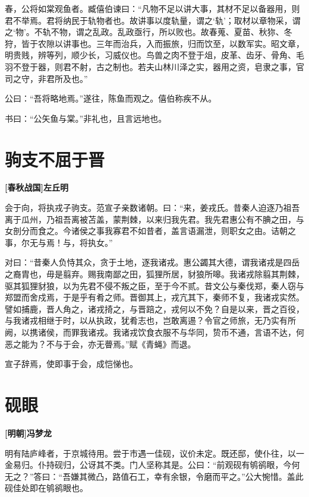 \documentclass[UTF8,titlepage,oneside]{ctexbook}
\begin{document}
春，公将如棠观鱼者。臧僖伯谏曰：“凡物不足以讲大事，其材不足以备器用，则君不举焉。君将纳民于轨物者也。故讲事以度轨量，谓之‘轨’；取材以章物采，谓之‘物’。不轨不物，谓之乱政。乱政亟行，所以败也。故春蒐、夏苗、秋狝、冬狩，皆于农隙以讲事也。三年而治兵，入而振旅，归而饮至，以数军实。昭文章，明贵贱，辨等列，顺少长，习威仪也。鸟兽之肉不登于俎，皮革、齿牙、骨角、毛羽不登于器，则君不射，古之制也。若夫山林川泽之实，器用之资，皂隶之事，官司之守，非君所及也。”


公曰：“吾将略地焉。”遂往，陈鱼而观之。僖伯称疾不从。


书曰：“公矢鱼与棠。”非礼也，且言远地也。



\chapter*{驹支不屈于晋}
\begin{center}
	\textbf{[春秋战国]左丘明}
\end{center}


会于向，将执戎子驹支。范宣子亲数诸朝。曰：“来，姜戎氏。昔秦人迫逐乃祖吾离于瓜州，乃祖吾离被苫盖，蒙荆棘，以来归我先君。我先君惠公有不腆之田，与女剖分而食之。今诸侯之事我寡君不如昔者，盖言语漏泄，则职女之由。诘朝之事，尔无与焉！与，将执女。”


对曰：“昔秦人负恃其众，贪于土地，逐我诸戎。惠公蠲其大德，谓我诸戎是四岳之裔胄也，毋是翦弃。赐我南鄙之田，狐狸所居，豺狼所嗥。我诸戎除翦其荆棘，驱其狐狸豺狼，以为先君不侵不叛之臣，至于今不贰。昔文公与秦伐郑，秦人窃与郑盟而舍戍焉，于是乎有肴之师。晋御其上，戎亢其下，秦师不复，我诸戎实然。譬如捕鹿，晋人角之，诸戎掎之，与晋踣之，戎何以不免？自是以来，晋之百役，与我诸戎相继于时，以从执政，犹肴志也，岂敢离逷？令官之师旅，无乃实有所阙，以携诸侯，而罪我诸戎。我诸戎饮食衣服不与华同，贽币不通，言语不达，何恶之能为？不与于会，亦无瞢焉。”赋《青蝇》而退。


宣子辞焉，使即事于会，成恺悌也。



\chapter*{砚眼}
\begin{center}
	\textbf{[明朝]冯梦龙}
\end{center}

明有陆庐峰者，于京城待用。尝于市遇一佳砚，议价未定。既还邸，使仆往，以一金易归。仆持砚归，公讶其不类。门人坚称其是。公曰：“前观砚有鸲鹆眼，今何无之？”答曰：“吾嫌其微凸，路值石工，幸有余银，令磨而平之。”公大惋惜。盖此砚佳处即在鸲鹆眼也。
\end{document}
